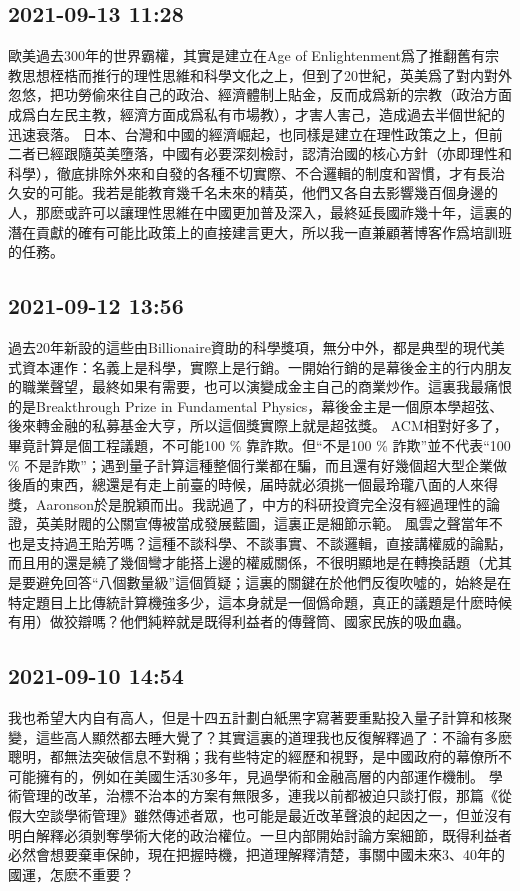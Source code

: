 \documentclass[twocolumn]{ctexart}
\begin{document}
\subsection*{2021-09-13 11:28}

歐美過去300年的世界霸權，其實是建立在Age of Enlightenment爲了推翻舊有宗教思想桎梏而推行的理性思維和科學文化之上，但到了20世紀，英美爲了對内對外忽悠，把功勞偷來往自己的政治、經濟體制上貼金，反而成爲新的宗教（政治方面成爲白左民主教，經濟方面成爲私有市場教），才害人害己，造成過去半個世紀的迅速衰落。
日本、台灣和中國的經濟崛起，也同樣是建立在理性政策之上，但前二者已經跟隨英美墮落，中國有必要深刻檢討，認清治國的核心方針（亦即理性和科學），徹底排除外來和自發的各種不切實際、不合邏輯的制度和習慣，才有長治久安的可能。我若是能教育幾千名未來的精英，他們又各自去影響幾百個身邊的人，那麽或許可以讓理性思維在中國更加普及深入，最終延長國祚幾十年，這裏的潛在貢獻的確有可能比政策上的直接建言更大，所以我一直兼顧著博客作爲培訓班的任務。
\subsection*{2021-09-12 13:56}

過去20年新設的這些由Billionaire資助的科學獎項，無分中外，都是典型的現代美式資本運作：名義上是科學，實際上是行銷。一開始行銷的是幕後金主的行内朋友的職業聲望，最終如果有需要，也可以演變成金主自己的商業炒作。這裏我最痛恨的是Breakthrough Prize in Fundamental Physics，幕後金主是一個原本學超弦、後來轉金融的私募基金大亨，所以這個獎實際上就是超弦獎。
ACM相對好多了，畢竟計算是個工程議題，不可能100 \% 靠詐欺。但“不是100 \% 詐欺”並不代表“100 \% 不是詐欺”；遇到量子計算這種整個行業都在騙，而且還有好幾個超大型企業做後盾的東西，總還是有走上前臺的時候，届時就必須挑一個最玲瓏八面的人來得獎，Aaronson於是脫穎而出。我説過了，中方的科研投資完全沒有經過理性的論證，英美財閥的公關宣傳被當成發展藍圖，這裏正是細節示範。
風雲之聲當年不也是支持過王貽芳嗎？這種不談科學、不談事實、不談邏輯，直接講權威的論點，而且用的還是繞了幾個彎才能搭上邊的權威關係，不很明顯地是在轉換話題（尤其是要避免回答“八個數量級”這個質疑；這裏的關鍵在於他們反復吹噓的，始終是在特定題目上比傳統計算機強多少，這本身就是一個僞命題，真正的議題是什麽時候有用）做狡辯嗎？他們純粹就是既得利益者的傳聲筒、國家民族的吸血蟲。
\subsection*{2021-09-10 14:54}

我也希望大内自有高人，但是十四五計劃白紙黑字寫著要重點投入量子計算和核聚變，這些高人顯然都去睡大覺了？其實這裏的道理我也反復解釋過了：不論有多麽聰明，都無法突破信息不對稱；我有些特定的經歷和視野，是中國政府的幕僚所不可能擁有的，例如在美國生活30多年，見過學術和金融高層的内部運作機制。
學術管理的改革，治標不治本的方案有無限多，連我以前都被迫只談打假，那篇《從假大空談學術管理》雖然傳述者眾，也可能是最近改革聲浪的起因之一，但並沒有明白解釋必須剝奪學術大佬的政治權位。一旦内部開始討論方案細節，既得利益者必然會想要棄車保帥，現在把握時機，把道理解釋清楚，事關中國未來3、40年的國運，怎麽不重要？
\end{document}
